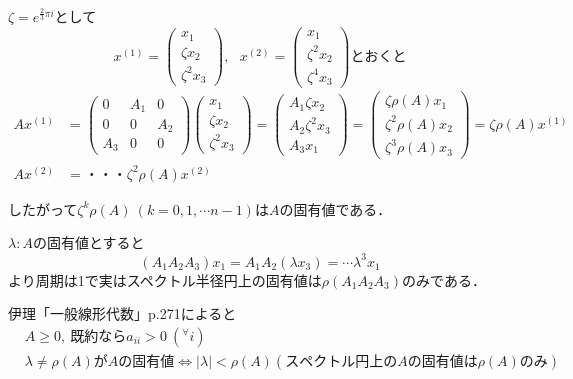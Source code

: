 $\zeta = e^{\frac{2}{3}\pi i}$として
\begin{equation*}
  x^{(1)}=
  \begin{pmatrix}
    x_1 \\
    \zeta x_2\\
    {\zeta}^2 x_3
  \end{pmatrix},\ \ \
  x^{(2)}=
  \begin{pmatrix}
    x_1\\
    {\zeta}^2 x_2\\
    {\zeta}^4 x_3
  \end{pmatrix}とおくと
\end{equation*}
\begin{align}
  Ax^{(1)}&=
  \begin{pmatrix}
    0&A_1 &0\\
    0&0&A_2\\
    A_3 &0&0
  \end{pmatrix}
  \begin{pmatrix}
    x_1\\
    \zeta x_2\\
    {\zeta}^2 x_3
  \end{pmatrix}=
  \begin{pmatrix}
    A_1 \zeta x_2\\
    A_2 {\zeta}^2 x_3\\
    A_3 x_1
  \end{pmatrix}=
  \begin{pmatrix}
    \zeta \rho (A)x_1\\
    {\zeta}^2 \rho (A)x_2\\
    {\zeta}^3 \rho (A)x_3
  \end{pmatrix}=\zeta \rho (A)x^{(1)}\\
  Ax^{(2)}&=・・・{\zeta}^2 \rho (A)x^{(2)}
\end{align}

したがって${\zeta}^k \rho (A)\ (k=0,1,\cdots n-1)$は$A$の固有値である．

$\lambda :A$の固有値とすると
\begin{equation*}
  (A_1 A_2 A_3 )x_1 = A_1 A_2 (\lambda x_3 )=\cdots {\lambda}^3 x_1
\end{equation*}
より周期は1で実はスペクトル半径円上の固有値は$\rho (A_1 A_2 A_3 )$のみである．

伊理「一般線形代数」p.271によると
\begin{align*}
  &A\geq 0,\ 既約ならa_{ii}>0 \ ({}^{\forall}i)\\
  &\lambda\neq\rho (A)がAの固有値\Leftrightarrow |\lambda |<\rho (A)(スペクトル円上のAの固有値は\rho (A)のみ)
\end{align*}

